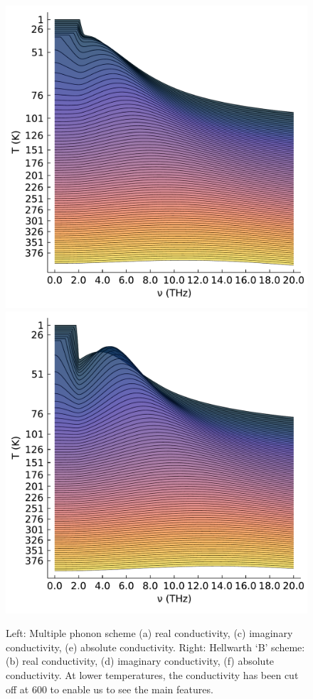 \begin{figure}
    \includegraphics[width=.49\textwidth]{figures/multi_plot_temp_abs.pdf}
    \includegraphics[width=.49\textwidth]{figures/B_plot_temp_abs.pdf}
    \caption{Left: Multiple phonon scheme (a) real conductivity, (c) imaginary conductivity, (e) absolute conductivity. Right: Hellwarth `B' scheme: (b) real conductivity, (d) imaginary conductivity, (f) absolute conductivity. At lower temperatures, the conductivity has been cut off at $600$ to enable us to see the main features.}
    \label{fig:multiridge}
\end{figure}

